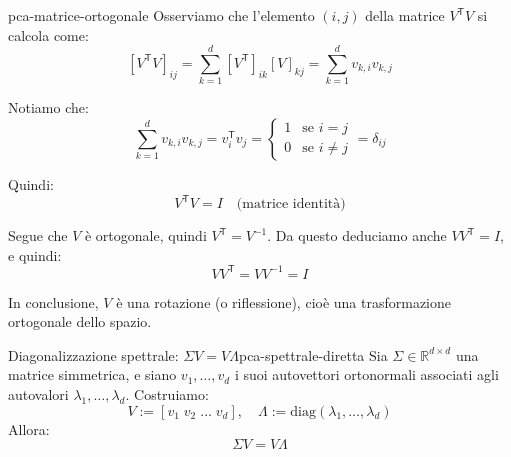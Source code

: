 \begin{dimostrazione}{}{pca-matrice-ortogonale}
Osserviamo che l’elemento \( (i, j) \) della matrice \( V^\mathsf{T} V \) si calcola come:
\[
[V^\mathsf{T} V]_{ij} = \sum_{k=1}^d [V^\mathsf{T}]_{ik} [V]_{kj}
= \sum_{k=1}^d v_{k,i} v_{k,j}
\]

Notiamo che:
\[
\sum_{k=1}^d v_{k,i} v_{k,j} = v_i^\mathsf{T} v_j = 
\begin{cases}
1 & \text{se } i = j \\
0 & \text{se } i \neq j
\end{cases}
= \delta_{ij}
\]

Quindi:
\[
V^\mathsf{T} V = I \quad \text{(matrice identità)}
\]

Segue che \( V \) è ortogonale, quindi \( V^\mathsf{T} = V^{-1} \).  
Da questo deduciamo anche \( VV^\mathsf{T} = I \), e quindi:
\[
VV^\mathsf{T} = V V^{-1} = I
\]

In conclusione, \( V \) è una rotazione (o riflessione), cioè una trasformazione ortogonale dello spazio.
\end{dimostrazione}

\begin{proposizione}{Diagonalizzazione spettrale: \texorpdfstring{\( \Sigma V = V \Lambda \)}{Sigma V = V Lambda}}{pca-spettrale-diretta}
Sia \( \Sigma \in \mathbb{R}^{d \times d} \) una matrice simmetrica, e siano \( v_1, \dots, v_d \) i suoi autovettori ortonormali associati agli autovalori \( \lambda_1, \dots, \lambda_d \). Costruiamo:
\[
V := [v_1 \; v_2 \; \dots \; v_d], \quad \Lambda := \mathrm{diag}(\lambda_1, \dots, \lambda_d)
\]
Allora:
\[
\Sigma V = V \Lambda
\]
\end{proposizione}

